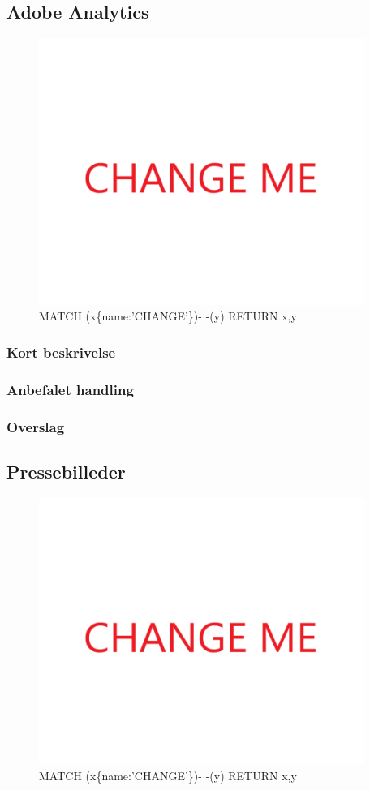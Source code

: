 \documentclass{article}
\begin{document}
\subsection{Adobe Analytics}
\begin{figure}[h]
\includegraphics[width=300pt]{CHANGE.PNG}
\caption{MATCH (x\{name:'CHANGE'\})- -(y) RETURN x,y}
\end{figure}
\subsubsection{Kort beskrivelse}
\subsubsection{Anbefalet handling}
\subsubsection{Overslag}
\subsection{Pressebilleder}
\begin{figure}[h]
\includegraphics[width=300pt]{CHANGE.PNG}
\caption{MATCH (x\{name:'CHANGE'\})- -(y) RETURN x,y}
\end{figure}
\end{document}
